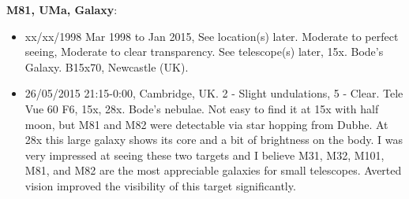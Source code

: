 {\bf M81, UMa, Galaxy}:
\begin{itemize}
\item xx/xx/1998 Mar 1998 to Jan 2015, See location(s) later. Moderate to perfect seeing, Moderate to clear transparency. See telescope(s) later, 15x. Bode's Galaxy. B15x70, Newcastle (UK).
\item 26/05/2015 21:15-0:00, Cambridge, UK. 2 - Slight undulations, 5 - Clear. Tele Vue 60 F6, 15x, 28x. Bode's nebulae. Not easy to find it at 15x with half moon, but M81 and M82 were detectable via star hopping from Dubhe. At 28x this large galaxy shows its core and a bit of brightness on the body. I was very impressed at seeing these two targets and I believe M31, M32, M101, M81, and M82 are the most appreciable galaxies for small telescopes. Averted vision improved the visibility of this target significantly.
\end{itemize}
